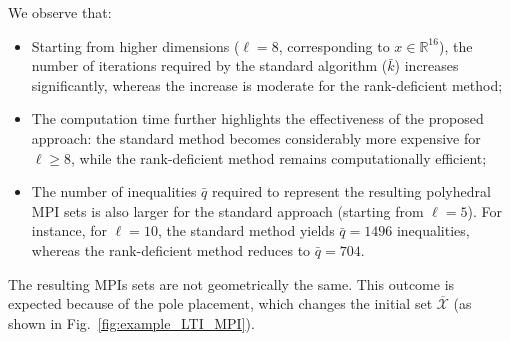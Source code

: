 \documentclass[journal,twoside,web]{ieeecolor}
\begin{document}
We observe that:
\begin{itemize}
    \item Starting from higher dimensions ($\ell = 8$, corresponding to $x \in \mathbb{R}^{16}$), the number of iterations required by the standard algorithm ($\bar k$) increases significantly, whereas the increase is moderate for the rank-deficient method;
    \item The computation time further highlights the effectiveness of the proposed approach: the standard method becomes considerably more expensive for $\ell \geq 8$, while the rank-deficient method remains computationally efficient;
    \item The number of inequalities $\bar q$ required to represent the resulting polyhedral MPI sets is also larger for the standard approach (starting from $\ell = 5$). For instance, for $\ell = 10$, the standard method yields $\bar q = 1496$ inequalities, whereas the rank-deficient method reduces to $\bar q = 704$.
\end{itemize}

The resulting MPIs sets are not geometrically the same. This outcome is expected because of the pole placement, which changes the initial set $\overline{\mathcal{X}}$ (as shown in Fig.~\ref{fig:example_LTI_MPI}).

\end{document}
